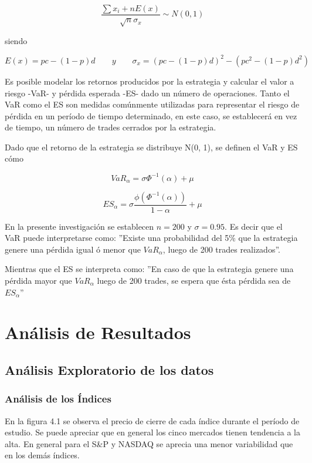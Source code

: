 \documentclass[a4paper,12pt]{Latex/Classes/PhDthesisPSnPDF}
\begin{document}
$$ \frac{\sum x_{i} + nE(x)}{\sqrt{n}\sigma_{x}} \sim N(0,1) $$

siendo

$$ E(x) = pc - (1-p)d \qquad y \qquad \sigma_{x} = (pc - (1-p)d)^{2} - (pc^{2} - (1-p)d^{2}) $$

Es posible modelar los retornos producidos por la estrategia y calcular el valor a riesgo -VaR- y pérdida esperada -ES- dado un número de operaciones. Tanto el VaR como el ES son medidas comúnmente utilizadas para representar el riesgo de pérdida en un período de tiempo determinado, en este caso, se establecerá en vez de tiempo, un número de trades cerrados por la estrategia.

Dado que el retorno de la estrategia se distribuye N(0, 1), se definen el VaR y ES cómo

$$ VaR_{\alpha} = \sigma \Phi^{-1}(\alpha) + \mu $$

$$ ES_{\alpha} = \sigma \frac{\phi(\Phi^{-1}(\alpha))}{1-\alpha} + \mu $$

En la presente investigación se establecen $n = 200$ y $\sigma = 0.95$. Es decir que el VaR puede interpretarse como: ''Existe una probabilidad del 5\% que la estrategia genere una pérdida igual ó menor que $VaR_{\alpha}$, luego de 200 trades realizados''.

Mientras que el ES se interpreta como: ''En caso de que la estrategia genere una pérdida mayor que $VaR_{\alpha}$ luego de 200 trades, se espera que ésta pérdida sea de $ES_{\alpha}$''

\chapter{Análisis de Resultados}

\section{Análisis Exploratorio de los datos}

\subsection{Análisis de los Índices}

En la figura 4.1 se observa el precio de cierre de cada índice durante el período de estudio. Se puede apreciar que en general los cinco mercados tienen tendencia a la alta. En general para el S\&P y NASDAQ se aprecia una menor variabilidad que en los demás índices.
\end{document}
